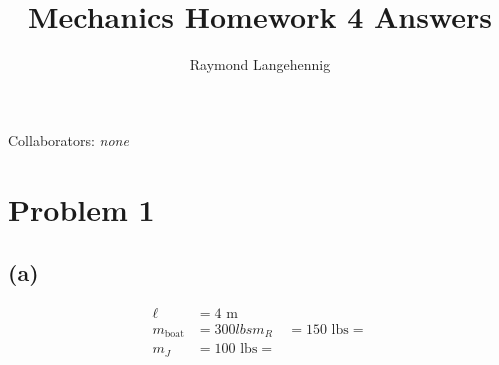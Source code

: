 \documentclass{article}
\title{Mechanics Homework 4 Answers}
\author{Raymond Langehennig}
\begin{document}
\maketitle
Collaborators: \textit{none}

\section*{Problem 1}
\subsection*{(a)}
\begin{align*}
    \ell&= 4 \mbox{ m}   \\
    m_\mathrm{boat} &= 300 lbs
    m_R &= 150 \mbox{ lbs} = \\
    m_J &= 100 \mbox{ lbs} = \\    
\end{align*}
\end{document}
